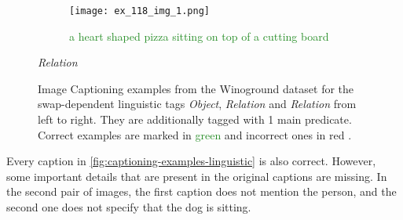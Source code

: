 \begin{figure}[ht]
\begin{minipage}[t]{.30\textwidth}
\begin{subfigure}[t]{\textwidth}
        \centering
        \texttt{[image: ex\_118\_img\_1.png]}
        \caption{\textcolor{ForestGreen}{a heart shaped pizza sitting on top of a cutting board \cmark}}
        \end{subfigure}%
        \caption*{\textit{Relation}}
    \end{minipage}%
    \caption{Image Captioning examples from the Winoground dataset for the swap-dependent linguistic tags \textit{Object}, \textit{Relation} and \textit{Relation} from left to right. They are additionally tagged with 1 main predicate.  Correct examples are marked in \textcolor{ForestGreen}{green \cmark} and incorrect ones in \textcolor{BrickRed}{red \xmark}.}
    \label{fig:captioning-examples}
\end{figure}

Every caption in \cref{fig:captioning-examples-linguistic} is also correct. However, some important details that are present in the original captions are missing. In the second pair of images, the first caption does not mention the person, and the second one does not specify that the dog is sitting.

